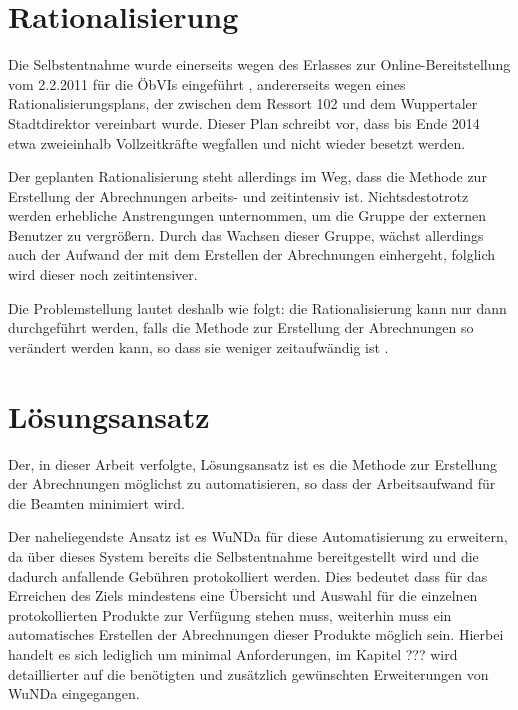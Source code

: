 \section{Rationalisierung}
Die Selbstentnahme wurde einerseits wegen des Erlasses zur Online-Bereitstellung vom 2.2.2011 für die \acp{ÖbVI} eingeführt \autocite[vgl.][]{wupp-wunda-oebvi}, andererseits wegen eines Rationalisierungsplans, der zwischen dem Ressort 102 und dem Wuppertaler Stadtdirektor vereinbart wurde.
Dieser Plan schreibt vor, dass bis Ende 2014 etwa zweieinhalb  Vollzeitkräfte wegfallen und nicht wieder besetzt werden.

Der geplanten Rationalisierung steht allerdings im Weg, dass die Methode zur Erstellung der Abrechnungen arbeits- und zeitintensiv ist.
Nichtsdestotrotz werden erhebliche Anstrengungen unternommen, um die Gruppe der externen Benutzer zu vergrößern.
Durch das Wachsen dieser Gruppe, wächst allerdings auch der Aufwand der mit dem Erstellen der Abrechnungen einhergeht, folglich wird dieser noch zeitintensiver.

Die Problemstellung lautet deshalb wie folgt: die Rationalisierung kann nur dann durchgeführt werden, falls die Methode zur Erstellung der Abrechnungen so verändert werden kann, so dass sie weniger zeitaufwändig ist \autocite[vgl.][]{sander-abrechnung}. 


\section{Lösungsansatz}

Der, in dieser Arbeit verfolgte, Lösungsansatz ist es die Methode zur Erstellung der Abrechnungen möglichst zu automatisieren, so dass der Arbeitsaufwand für die Beamten minimiert wird. 

Der naheliegendste Ansatz ist es \acs{WuNDa} für diese Automatisierung zu erweitern, da über dieses System bereits die Selbstentnahme bereitgestellt wird und die dadurch anfallende Gebühren protokolliert werden. Dies bedeutet dass für das Erreichen des Ziels mindestens eine Übersicht und Auswahl für die einzelnen protokollierten Produkte zur Verfügung stehen muss, weiterhin muss ein automatisches Erstellen der Abrechnungen dieser Produkte möglich sein. Hierbei handelt es sich lediglich um minimal Anforderungen, im Kapitel ??? wird detaillierter auf die benötigten und zusätzlich gewünschten Erweiterungen von \ac{WuNDa} eingegangen. 

